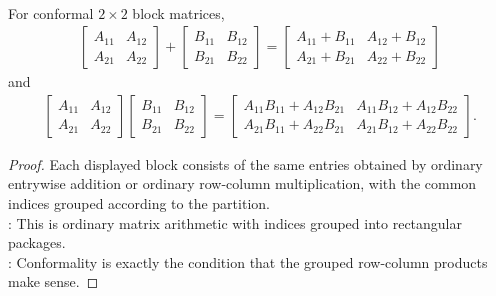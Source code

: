 \begin{proposition} \label{prop:block-matrix-arithmetic} \\
For conformal $2\times2$ block matrices,
\begin{align}
\begin{bmatrix}
A_{11} & A_{12}\\
A_{21} & A_{22}
\end{bmatrix}
+
\begin{bmatrix}
B_{11} & B_{12}\\
B_{21} & B_{22}
\end{bmatrix}
=
\begin{bmatrix}
A_{11}+B_{11} & A_{12}+B_{12}\\
A_{21}+B_{21} & A_{22}+B_{22}
\end{bmatrix}
\nonumber
\end{align}
and
\begin{align}
\begin{bmatrix}
A_{11} & A_{12}\\
A_{21} & A_{22}
\end{bmatrix}
\begin{bmatrix}
B_{11} & B_{12}\\
B_{21} & B_{22}
\end{bmatrix}
=
\begin{bmatrix}
A_{11}B_{11}+A_{12}B_{21} & A_{11}B_{12}+A_{12}B_{22}\\
A_{21}B_{11}+A_{22}B_{21} & A_{21}B_{12}+A_{22}B_{22}
\end{bmatrix}.
\nonumber
\end{align}
\begin{proof}
Each displayed block consists of the same entries obtained by ordinary entrywise addition or ordinary row-column multiplication, with the common indices grouped according to the partition.\\
: This is ordinary matrix arithmetic with indices grouped into rectangular packages.\\
: Conformality is exactly the condition that the grouped row-column products make sense.
\end{proof}
\end{proposition}

